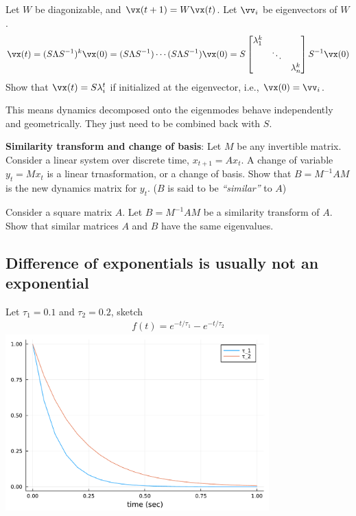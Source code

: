 \documentclass[a4paper,11pt]{exam}
\newcounter{ct}
\newcommand{\inv}{^{-1}}
\begin{document}
\begin{questions}
Let $W$ be diagonizable, and $\vx(t+1) = W\vx(t)$. Let $\vv_i$ be eigenvectors of $W$.
\begin{align}
	\vx(t) =
	(S \Lambda S\inv)^k \vx(0) =
	(S \Lambda S\inv) \cdots
	(S \Lambda S\inv) \vx(0)
	=
	S \begin{bmatrix}
	\lambda_1^k & &\\
	& \ddots & \\
	& & \lambda_n^k
	\end{bmatrix}
	S\inv \vx(0)
\end{align}
\question Show that $\vx(t) = S\lambda_i^t$ if initialized at the eigenvector, i.e., $\vx(0) = \vv_i$.

This means dynamics decomposed onto the eigenmodes behave independently and geometrically.
They just need to be combined back with $S$.

\question \textbf{Similarity transform and change of basis}:
Let $M$ be any invertible matrix.
Consider a linear system over discrete time, $x_{t+1} = Ax_t$.
A change of variable $y_t = Mx_t$ is a linear trnasformation, or a change of basis.
Show that $B = M\inv A M$ is the new dynamics matrix for $y_t$.
($B$ is said to be \textit{``similar''} to $A$)

\question Consider a square matrix $A$. Let $B = M\inv A M$ be a similarity transform of $A$.
Show that similar matrices $A$ and $B$ have the same eigenvalues.


\subsection{Difference of exponentials is usually not an exponential}
\question Let $\tau_1 = 0.1$ and $\tau_2 = 0.2$, sketch
\begin{align}\label{eq:diff_ex:eg}
    f(t) = e^{-t/\tau_1} - e^{-t/\tau_2}
\end{align}
\includegraphics[width=4in]{diff_exp_decay}


\end{questions}
\end{document}
